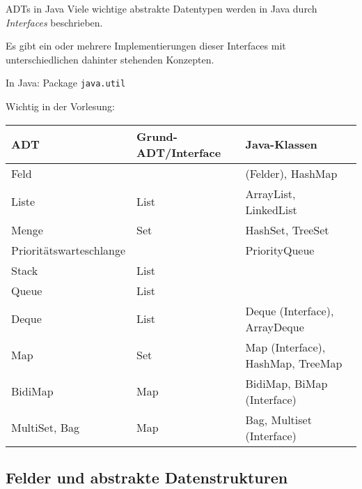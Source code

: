 \documentclass[german]{../spicker}
\begin{document}
\begin{bonus}{ADTs in Java}
    Viele wichtige abstrakte Datentypen werden in Java durch \emph{Interfaces} beschrieben.

    Es gibt ein oder mehrere Implementierungen dieser Interfaces mit unterschiedlichen dahinter stehenden Konzepten.

    In Java: Package \texttt{java.util}

    Wichtig in der Vorlesung:

    \begin{tabular}{l|l|l}
        ADT                     & Grund-ADT/Interface & Java-Klassen                      \\
        \hline
        Feld                    &                     & (Felder), HashMap                 \\
        Liste                   & List                & ArrayList, LinkedList             \\
        Menge                   & Set                 & HashSet, TreeSet                  \\
        Prioritätswarteschlange &                     & PriorityQueue                     \\
        Stack                   & List                &                                   \\
        Queue                   & List                &                                   \\
        Deque                   & List                & Deque (Interface), ArrayDeque     \\
        Map                     & Set                 & Map (Interface), HashMap, TreeMap \\
        BidiMap                 & Map                 & BidiMap, BiMap (Interface)        \\
        MultiSet, Bag           & Map                 & Bag, Multiset (Interface)
    \end{tabular}
\end{bonus}

\subsection{Felder und abstrakte Datenstrukturen}
\end{document}
